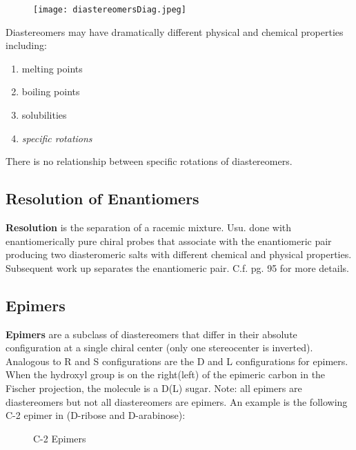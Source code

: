 \documentclass[../OChemReview.tex]{subfiles}
\begin{document}
  \begin{figure}[h]
    \centering
    \texttt{[image: diastereomersDiag.jpeg]}
  \end{figure}

  Diastereomers may have dramatically different physical and chemical properties
  including:
  \begin{enumerate}
    \item melting points
    \item boiling points
    \item solubilities
    \item \emph{specific rotations}
  \end{enumerate}

  There is no relationship between specific rotations of diastereomers.

  \subsection{Resolution of Enantiomers}

  \textbf{Resolution} is the separation of a racemic mixture. Usu. done with
  enantiomerically pure chiral probes that associate with the enantiomeric pair
  producing two diasteromeric salts with different chemical and physical
  properties. Subsequent work up separates the enantiomeric pair. C.f. pg. 95
  for more details.

  \subsection{Epimers\supddag}

  \textbf{Epimers} are a subclass of diastereomers that differ in their absolute
  configuration at a single chiral center (only one stereocenter is inverted).
  Analogous to R and S configurations are the D and L configurations for
  epimers. When the hydroxyl group is on the right(left) of the epimeric carbon
  in the Fischer projection, the molecule is a D(L) sugar. Note: all epimers are
  diastereomers but not all diastereomers are epimers. An example is the
  following C-2 epimer in  (D-ribose and D-arabinose):

  \begin{figure}[h]
    \centering
    \caption{C-2 Epimers}
    \hspace{5em}
    \label{epimers}
  \end{figure}
  \newpage
\end{document}
